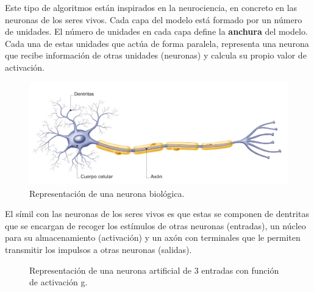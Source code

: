 Este tipo de algoritmos están inspirados en la neurociencia, en concreto en las neuronas de los seres vivos. Cada capa del modelo está formado por un número de unidades. El número de unidades en cada capa define la \textbf{anchura} del modelo. Cada una de estas unidades que actúa de forma paralela, representa una neurona que recibe información de otras unidades (neuronas) y calcula su propio valor de activación. 

\begin{figure}[h!]
	\centering
	\includegraphics[width=0.7\linewidth]{imagenes/Neurona}
	\caption{Representación de una neurona biológica.}
	\label{fig:neurona}
\end{figure}


El símil con las neuronas de los seres vivos es que estas se componen de dentritas que se encargan de recoger los estímulos de otras neuronas (entradas), un núcleo para su almacenamiento (activación) y un axón con terminales que le permiten transmitir los impulsos a otras neuronas (salidas).

\begin{figure}[h!]
\centering
{}
\caption{Representación de una neurona artificial de 3 entradas con función de activación g.}
\label{fig:neuron_articial}
\end{figure}

